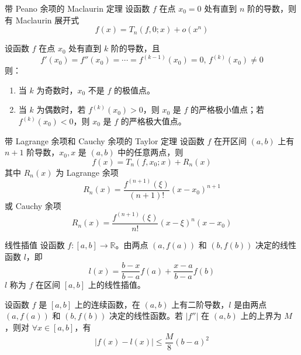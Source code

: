\begin{theorem}{带 Peano 余项的 Maclaurin 定理}
    设函数 $f$ 在点 $x_0 = 0$ 处有直到 $n$ 阶的导数，则有 Maclaurin 展开式
    \[f(x) = T_n(f,0;x) + o(x^n)\]
\end{theorem}

\begin{theorem}
    设函数 $f$ 在点 $x_0$ 处有直到 $k$ 阶的导数，且
    \[f'(x_0) = f''(x_0) = \cdots = f^{(k - 1)}(x_0) = 0,\, f^{(k)}(x_0) \ne 0\]
    则：
    \begin{enumerate}
        \item 当 $k$ 为奇数时，$x_0$ 不是 $f$ 的极值点。
        \item 当 $k$ 为偶数时，若 $f^{(k)}(x_0) > 0$，则 $x_0$ 是 $f$ 的严格极小值点；若 $f^{(k)}(x_0) < 0$，则 $x_0$ 是 $f$ 的严格极大值点。
    \end{enumerate}
\end{theorem}

\begin{theorem}{带 Lagrange 余项和 Cauchy 余项的 Taylor 定理}
    设函数 $f$ 在开区间 $(a,b)$ 上有 $n + 1$ 阶导数，$x_0,x$ 是 $(a,b)$ 中的任意两点，则
    \[f(x) = T_n(f,x_0;x) + R_n(x)\]
    其中 $R_n(x)$ 为 Lagrange 余项
    \[R_n(x) = \frac{f^{(n + 1)}(\xi)}{(n + 1)!}(x - x_0)^{n + 1}\]
    或 Cauchy 余项
    \[R_n(x) = \frac{f^{(n + 1)}(\xi)}{n!}(x - \xi)^n(x - x_0)\]
\end{theorem}

\begin{definition}{线性插值}
    设函数 $f:[a,b] \to \mathbb{R}$。由两点 $(a,f(a))$ 和 $(b,f(b))$ 决定的线性函数 $l$，即
    \[l(x) = \frac{b - x}{b -a}f(a) + \frac{x - a}{b - a}f(b)\]
    $l$ 称为 $f$ 在区间 $[a,b]$ 上的线性插值。
\end{definition}

\begin{theorem}
    设函数 $f$ 是 $[a,b]$ 上的连续函数，在 $(a,b)$ 上有二阶导数，$l$ 是由两点 $(a,f(a))$ 和 $(b,f(b))$ 决定的线性函数。若 $|f''|$ 在 $(a,b)$ 上的上界为 $M$，则对 $\forall x \in [a,b]$，有
    \[|f(x) - l(x)| \leqslant \frac{M}{8}(b - a)^2\]
\end{theorem}

